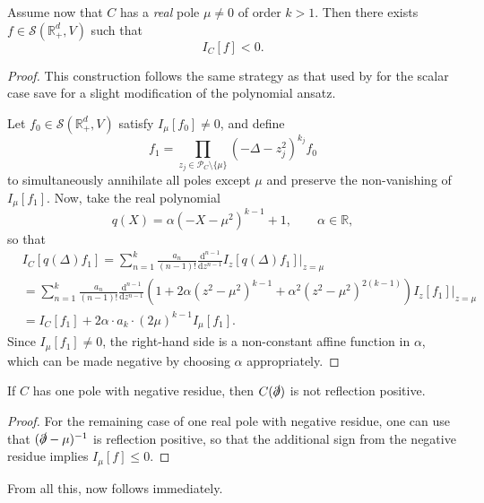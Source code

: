 \documentclass[10pt,a4paper,oneside,reqno]{amsart}
\newcommand{\reals}{\mathbb{R}}
\begin{document}
\begin{prop} 
Assume now that $C$ has a \textit{real} pole $\mu \ne 0$ of order $k>1$. Then there exists $f \in \mathcal{S}(\mathbb{R}^d_+, V)$ such that 
\begin{equation*}
I_C[f] < 0.
\end{equation*}
\end{prop}
\begin{proof}This construction follows the same strategy as that used by \textcite{Saueressig2018_RP} for the scalar case save for a slight modification of the polynomial ansatz.

Let $f_0 \in \mathcal{S}(\mathbb{R}^d_+, V)$ satisfy $I_\mu[f_0] \neq 0$, and define
\begin{equation}
        f_1 =
    \prod_{z_j \in \mathcal{P}_C\setminus\{\mu\}}
    (-\Delta - z_j^2)^{k_j} f_0
\end{equation}
to simultaneously annihilate all poles except $\mu$ and preserve the non-vanishing of $I_\mu[f_1]$.
Now, take the real polynomial
\begin{equation}
    q(X) = \alpha (-X-\mu^2)^{k-1} +1, \qquad \alpha \in \reals,
\end{equation}
so that 
\begin{align}
    &I_C[q(\Delta)f_1] = \sum_{n=1}^{k}\frac{a_n}{(n-1)!} 	\frac{\mathrm{d}^{n-1}}{\mathrm{d} z^{n-1} } I_{z}[q(\Delta)f_1]\Bigr|_{z=\mu}\\
    &=  \sum_{n=1}^{k}\frac{a_n}{(n-1)!} \frac{\mathrm{d}^{n-1}}{\mathrm{d}z^{n-1} } \left(1+ 2\alpha(z^2-\mu^2)^{k-1}+\alpha^2(z^2-\mu^2)^{2(k-1)}\right)I_z[f_1] \Big\rvert_{z=\mu}\\
    &= I_C[f_1] + 2\alpha\cdot a_k \cdot(2\mu)^{k-1}I_{\mu}[f_1].
\end{align}
Since $I_\mu[f_1] \neq 0$, the right-hand side is a non-constant affine function in $\alpha$, which can be made negative by choosing $\alpha$ appropriately.
\end{proof}
\begin{prop}\label{Negative Residues}
    If $C$ has one pole with negative residue, then $C(\slashed{\partial})$ is not reflection positive.
\end{prop}
\begin{proof}
For the remaining case of one real pole with negative residue, one can use that $(\slashed{\partial} - \mu)^{-1}$ is reflection positive, so that the additional sign from the negative residue implies $I_\mu[f] \leq 0$. 
\end{proof}
\noindent
From all this,  now follows immediately.
\bigskip
\end{document}
